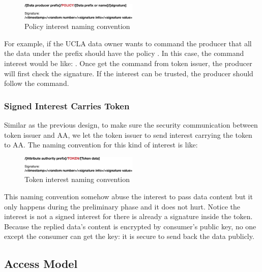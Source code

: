 \begin{figure}[H]
  \centering
  \includegraphics[width=0.5\textwidth]{figures/policy-interest}
  \vspace{-3mm}
  \caption{Policy interest naming convention}
\end{figure}

For example, if the UCLA data owner wants to command the producer  that all the data under the prefix  should have the policy .
In this case, the command interest would be like:
.
Once get the command from token issuer, the producer will first check the signature.
If the interest can be trusted, the producer should follow the command.

\subsubsection{Signed Interest Carries Token}

Similar as the previous design, to make sure the security communication between token issuer and AA, we let the token issuer to send interest carrying the token to AA.
The naming convention for this kind of  interest is like:

\begin{figure}[H]
  \centering
  \includegraphics[width=0.5\textwidth]{figures/token-interest}
  \vspace{-3mm}
  \caption{Token interest naming convention}
\end{figure}

This naming convention somehow abuse the interest to pass data content but it only happens during the preliminary phase and it does not hurt.
Notice the interest is not a signed interest for there is already a signature inside the token.
Because the replied data's content is encrypted by consumer's public key, no one except the consumer can get the key: it is secure to send back the data publicly.

\subsection{Access Model}
